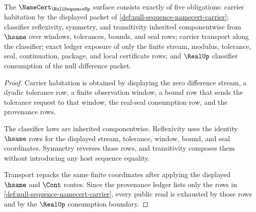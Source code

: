 \begin{theorem}
\label{thm:null-sequence-namecert-obligations}
The $\NameCert_{\NullSequenceUp}$ surface consists exactly of five obligations: carrier habitation by the displayed packet of \autoref{def:null-sequence-namecert-carrier}; classifier reflexivity, symmetry, and transitivity inherited componentwise from $\hsame$ over windows, tolerances, bounds, and seal rows; carrier transport along the classifier; exact ledger exposure of only the finite stream, modulus, tolerance, seal, continuation, package, and local certificate rows; and $\RealUp$ classifier consumption of the null difference packet.
\end{theorem}
\begin{proof}
Carrier habitation is obtained by displaying the zero difference stream, a dyadic tolerance row, a finite observation window, a bound row that sends the tolerance request to that window, the real-seal consumption row, and the provenance rows.

The classifier laws are inherited componentwise. Reflexivity uses the identity $\hsame$ rows for the displayed stream, tolerance, window, bound, and seal coordinates. Symmetry reverses those rows, and transitivity composes them without introducing any host sequence equality.

Transport repacks the same finite coordinates after applying the displayed $\hsame$ and $\Cont$ routes. Since the provenance ledger lists only the rows in \autoref{def:null-sequence-namecert-carrier}, every public read is exhausted by those rows and by the $\RealUp$ consumption boundary.
\end{proof}

